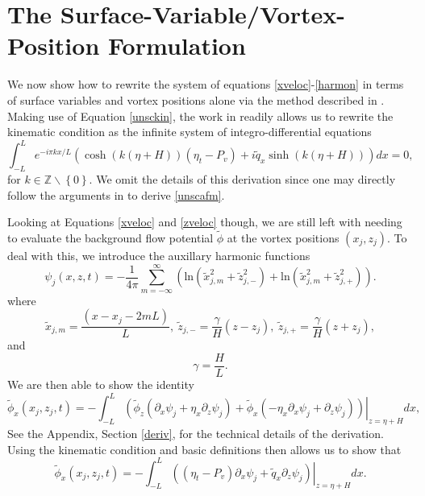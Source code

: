 \documentclass[a4paper,11pt]{article}
\newcommand{\p}{\partial}
\begin{document}
\section{The Surface-Variable/Vortex-Position Formulation}
We now show how to rewrite the system of equations \eqref{xveloc}-\eqref{harmon} in terms of surface variables and vortex positions alone via the method described in \cite{afm}.  Making use of Equation \eqref{unsckin}, the work in \cite{afm} readily allows us to rewrite the kinematic condition as the infinite system of integro-differential equations  
\begin{equation}
\int_{-L}^{L} e^{-i\pi k x/L}\left(\cosh( k(\eta+H))\left(\eta_{t} - P_{v} \right) + i\tilde{q}_{x}\sinh(k( \eta+H))\right) dx = 0, \label{unscafm}
\end{equation}
for $k \in \mathbb{Z}\backslash\left\{0\right\}$.  We omit the details of this derivation since one may directly follow the arguments in \cite{afm} to derive \eqref{unscafm}.

Looking at Equations \eqref{xveloc} and \eqref{zveloc} though, we are still left with needing to evaluate the background flow potential $\tilde{\phi}$ at the vortex positions $\left(x_{j}, z_{j}\right)$.  To deal with this, we introduce the auxillary harmonic functions 
\[
\psi_{j}(x,z,t) = - \frac{1}{4\pi}\sum_{m=-\infty}^{\infty} \left( \mbox{ln}\left( \tilde{x}_{j,m}^{2} + \tilde{z}_{j,-}^{2}  \right) + \mbox{ln}\left( \tilde{x}_{j,m}^{2} + \tilde{z}_{j,+}^{2} \right)\right).
\]
where
\[
\tilde{x}_{j,m} = \frac{(x-x_{j}-2mL)}{L}, ~ \tilde{z}_{j,-} = \frac{\gamma}{H}(z-z_{j}), ~ \tilde{z}_{j,+} = \frac{\gamma}{H}(z+z_{j}),
\]
and
\[
\gamma = \frac{H}{L}.
\]
We are then able to show the identity
\[
\tilde{\phi}_{x}(x_{j},z_{j},t) = -\int_{-L}^{L} \left.\left(\tilde{\phi}_{z}\left(\p_{x}\psi_{j}+ \eta_{x}\p_{z}\psi_{j}\right)+\tilde{\phi}_{x}\left(-\eta_{x}\p_{x}\psi_{j} + \p_{z}\psi_{j} \right) \right)\right|_{z=\eta+H}dx,
\]
See the Appendix, Section \ref{deriv}, for the technical details of the derivation.  Using the kinematic condition and basic definitions then allows us to show that 
\begin{equation}
\tilde{\phi}_{x}(x_{j},z_{j},t) = -\int_{-L}^{L}\left.\left(\left(\eta_{t}-P_{v}\right)\p_{x}\psi_{j} + \tilde{q}_{x}\p_{z}\psi_{j} \right) \right|_{z=\eta+H} dx.
\label{blkeq}
\end{equation}
\end{document}
